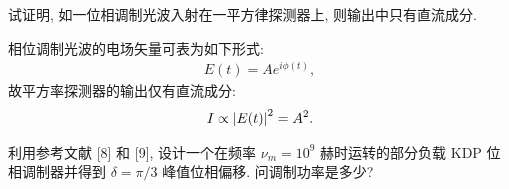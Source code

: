 \documentclass{note}
\begin{document}
\begin{exe}
    试证明, 如一位相调制光波入射在一平方律探测器上, 则输出中只有直流成分.
\end{exe}
\begin{pf}
    相位调制光波的电场矢量可表为如下形式:
    \begin{align}
        E(t)=Ae^{i\phi(t)},
    \end{align}
    故平方率探测器的输出仅有直流成分:
    \begin{align}
        I\propto\left\lvert E(t)\right\rvert^2=A^2.
    \end{align}
\end{pf}

\begin{exe}
    利用参考文献 [8] 和 [9], 设计一个在频率 $\nu_m=10^9$ 赫时运转的部分负载 KDP 位相调制器并得到 $\delta=\pi/3$ 峰值位相偏移. 问调制功率是多少?
\end{exe}
\end{document}

